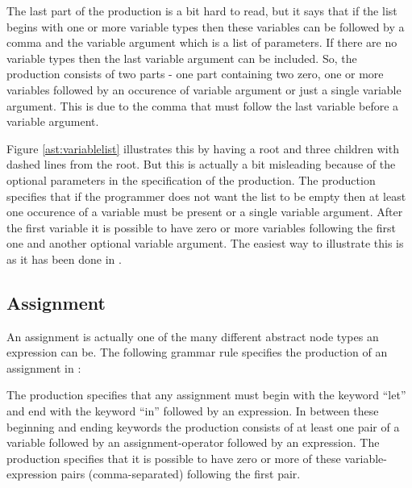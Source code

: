 The last part of the production is a bit hard to read, but it says that if the list begins with one or more variable types then these variables can be followed by a comma and the variable argument which is a list of parameters. If there are no variable types then the last variable argument can be included. So, the production consists of two parts - one part containing two zero, one or more variables followed by an occurence of variable argument or just a single variable argument. This is due to the comma that must follow the last variable before a variable argument.%

%

Figure \ref{ast:variablelist} illustrates this by having a root and three children with dashed lines from the root. But this is actually a bit misleading because of the optional parameters in the specification of the production. The production specifies that if the programmer does not want the list to be empty then at least one occurence of a variable must be present or a single variable argument. After the first variable it is possible to have zero or more variables following the first one and another optional variable argument. The easiest way to illustrate this is as it has been done in .%

\subsection{Assignment}%

An assignment is actually one of the many different abstract node types an expression can be. The following grammar rule specifies the production of an assignment in \productname{}:%

\begin{ebnf}%
%
\end{ebnf}%

The production specifies that any assignment must begin with the keyword ``let'' and end with the keyword ``in'' followed by an expression. In between these beginning and ending keywords the production consists of at least one pair of a variable followed by an assignment-operator followed by an expression. The production specifies that it is possible to have zero or more of these variable-expression pairs (comma-separated) following the first pair.%

